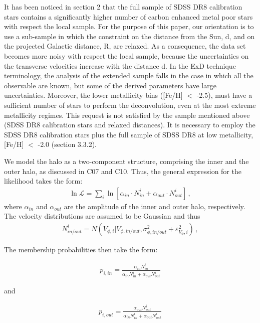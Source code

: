 \documentclass[apj]{emulateapj}
\begin{document}
It has been noticed in section 2 that the full sample of SDSS DR8
calibration stars contains a significantly higher number of carbon
enhanced metal poor stars with respect the local sample. For the
purpose of this paper, our orientation is to use a sub-sample in which
the constraint on the distance from the Sun, d, and on the projected
Galactic distance, R, are relaxed. As a consequence, the data set
becomes more noisy with respect the local sample, because the
uncertainties on the transverse velocities increase with the distance
d. In the ExD technique terminology, the analysis of the extended
sample falls in the case in which all the observable are known, but
some of the derived parameters have large uncertainties. Moreover, the
lower metallicity bins ([Fe/H] $<$ -2.5), must have a sufficient
number of stars to perform the deconvolution, even at the most extreme
metallicity regimes. This request is not satisfied by the sample
mentioned above (SDSS DR8 calibration stars and relaxed distances). It
is necessary to employ the SDSS DR8 calibration stars plus the full
sample of SDSS DR8 at low metallicity, [Fe/H] $<$ -2.0 (section
3.3.2).

We model the halo as a two-component structure, comprising the inner
and the outer halo, as discussed in C07 and C10.
Thus, the general expression for the likelihood takes the form:
\begin{eqnarray}
\ln \mathcal{L} = \displaystyle\sum_{i} \ln [\alpha_{in}\cdot N^{i}_{in} + \alpha_{out}\cdot N^{i}_{out}]\,,
\end{eqnarray}
where $\alpha_{in}$ and $\alpha_{out}$ are the amplitude of the
inner and outer halo, respectively. The velocity distributions are
assumed to be Gaussian and thus
\begin{eqnarray}
N^i_{in/out} = N(V_{\phi,i} | V_{\phi,in/out},\sigma^2_{\phi,in/out}+\varepsilon^2_{V_{\phi},i})\,,
\end{eqnarray}

The membership probabilities then take the form:

\begin{eqnarray}
p_{i, in} = \frac{\alpha_{in}N_{in}^{i}}{\alpha_{in}N_{in}^{i} + \alpha_{out}N_{out}^{i}}
\end{eqnarray}

and

\begin{eqnarray}
p_{i, out} = \frac{\alpha_{out}N_{out}^{i}}{\alpha_{in}N_{in}^{i} + \alpha_{out}N_{out}^{i}}
\end{eqnarray}
\end{document}
